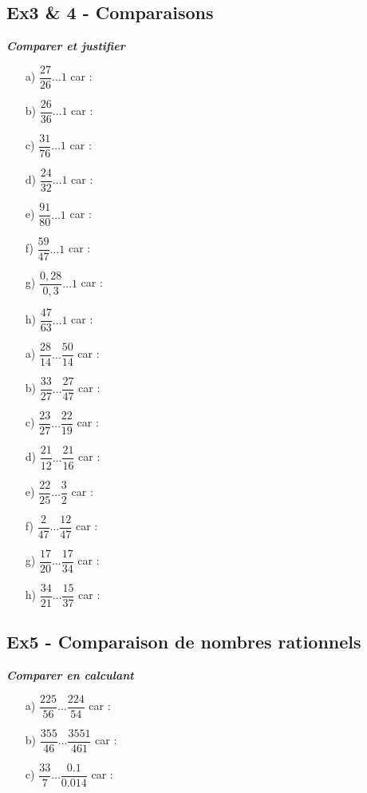 \documentclass[11pt]{article}
\begin{document}
\subsection*{Ex3 \& 4 - Comparaisons}
\textit{\textbf{Comparer et justifier}}

\begin{multicols}{2}

  \begin{enumerate}
    \item[a)] $ \dfrac{27}{26} \ldots 1 $ car : \dotfill
    \item[b)] $ \dfrac{26}{36}  \ldots 1 $ car : \dotfill
    \item[c)] $ \dfrac{31}{76} \ldots 1 $ car : \dotfill
    \item[d)] $ \dfrac{24}{32} \ldots 1 $ car : \dotfill
    \item[e)] $ \dfrac{91}{80} \ldots 1 $ car : \dotfill
    \item[f)] $ \dfrac{59}{47} \ldots 1 $ car : \dotfill
    \item[g)] $ \dfrac{0,28}{0,3} \ldots 1 $ car : \dotfill
    \item[h)] $ \dfrac{47}{63} \ldots 1 $ car : \dotfill
  \end{enumerate}

\columnbreak

  \begin{enumerate}
    \item[a)] $ \dfrac{28}{14} \ldots \dfrac{50}{14} $  car : \dotfill
    \item[b)] $ \dfrac{33}{27} \ldots  \dfrac{27}{47}  $  car : \dotfill
    \item[c)] $ \dfrac{23}{27} \ldots \dfrac{22}{19} $  car : \dotfill
    \item[d)] $ \dfrac{21}{12} \ldots  \dfrac{21}{16}  $  car : \dotfill
    \item[e)] $ \dfrac{22}{25} \ldots \dfrac{3}{2} $  car : \dotfill
    \item[f)] $ \dfrac{2}{47} \ldots  \dfrac{12}{47} $  car : \dotfill
    \item[g)] $ \dfrac{17}{20} \ldots \dfrac{17}{34} $  car : \dotfill
    \item[h)] $ \dfrac{34}{21} \ldots \dfrac{15}{37} $  car : \dotfill
  \end{enumerate}

\end{multicols}

\subsection*{Ex5 - Comparaison de nombres rationnels}

\textit{\textbf{Comparer en calculant}}

\begin{enumerate}
  \item[a)] $ \dfrac{225}{56} \ldots \dfrac{224}{54} $  car : \dotfill
  \item[b)] $ \dfrac{355}{46} \ldots \dfrac{3551}{461} $  car : \dotfill
  \item[c)] $ \dfrac{33}{7} \ldots \dfrac{0.1}{0.014} $  car : \dotfill
\end{enumerate}
\end{document}
